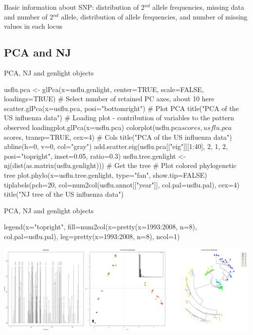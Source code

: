 \documentclass[compress, ucs, xelatex, 11pt, xcolor=svgnames, aspectratio=169,
	hyperref={
		bookmarks=true,
		unicode=true,
		colorlinks=true,
		pdftitle={Molecular data in R},
		plainpages=false,
		pdfauthor={Vojtech Zeisek},
		pdfsubject={Course about phylogeny and evolution in R},
		pdfcreator={XeLaTeX},
		pdfkeywords={R, evolution, phylogeny, molecular data},
		linkcolor=Crimson, %
		anchorcolor=Magenta, %
		citecolor=Magenta, %
		filecolor=Magenta, %
		menucolor=Magenta, %
		urlcolor=DodgerBlue, %
		pdftex},
	url={hyphens, lowtilde} %
	]{beamer}
\renewcommand{\texttt}[1]{\colorbox{Beige}{{\ttfamily #1}}}
\begin{document}
\begin{frame}{Basic information about SNP: distribution of 2$^{nd}$ allele frequencies, missing data and number of 2$^{nd}$ allele, distribution of allele frequencies, and number of missing values in each locus}
	\begin{center}
		\texttt{[image: flu\_alleles.png]}
	\end{center}
\end{frame}

\subsection{PCA and NJ}

\begin{frame}[fragile]{PCA, NJ and genlight objects}
	\begin{spluscode}
    usflu.pca <- glPca(x=usflu.genlight, center=TRUE, scale=FALSE,
      loadings=TRUE) # Select number of retained PC axes, about 10 here
    scatter.glPca(x=usflu.pca, posi="bottomright") # Plot PCA
    title("PCA of the US influenza data")
    # Loading plot - contribution of variables to the pattern observed
    loadingplot.glPca(x=usflu.pca)
    colorplot(usflu.pca$scores, usflu.pca$scores, transp=TRUE, cex=4) # Cols
    title("PCA of the US influenza data")
    abline(h=0, v=0, col="gray")
    add.scatter.eig(usflu.pca[["eig"]][1:40], 2, 1, 2, posi="topright",
      inset=0.05, ratio=0.3)
    usflu.tree.genlight <- nj(dist(as.matrix(usflu.genlight))) # Get the tree
    # Plot colored phylogenetic tree
    plot.phylo(x=usflu.tree.genlight, type="fan", show.tip=FALSE)
    tiplabels(pch=20, col=num2col(usflu.annot[["year"]], col.pal=usflu.pal),
      cex=4)
    title("NJ tree of the US influenza data")
	\end{spluscode}
\end{frame}

\begin{frame}[fragile]{PCA, NJ and genlight objects}
	\begin{spluscode}
    legend(x="topright", fill=num2col(x=pretty(x=1993:2008, n=8),
      col.pal=usflu.pal), leg=pretty(x=1993:2008, n=8), ncol=1)
	\end{spluscode}
	\begin{center}
		\includegraphics[width=\textwidth-5.5cm]{flu_pcoa_nj.png}
	\end{center}
\end{frame}
\end{document}

